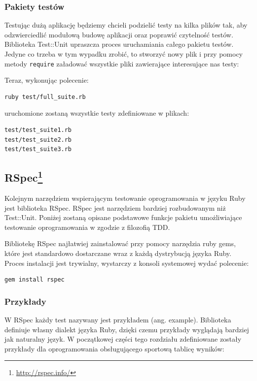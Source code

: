     \subsubsection{Pakiety testów}
    Testując dużą aplikację będziemy chcieli podzielić testy na kilka plików tak, aby odzwierciedlić modułową budowę aplikacji oraz poprawić czytelność testów. Biblioteka Test::Unit upraszcza proces uruchamiania całego pakietu testów. Jedyne co trzeba w tym wypadku zrobić, to stworzyć nowy plik i przy pomocy metody \texttt{require} załadować wszystkie pliki zawierające interesujące nas testy:
    
    
    
    Teraz, wykonując polecenie:
    
\begin{lstlisting} 
ruby test/full_suite.rb
\end{lstlisting}
    
    uruchomione zostaną wszystkie testy zdefiniowane w plikach:
    
\begin{lstlisting} 
test/test_suite1.rb
test/test_suite2.rb
test/test_suite3.rb
\end{lstlisting}
    
    \subsection[RSpec]{RSpec\footnote{\url{http://rspec.info/}\nocite{rspec}}}
    
    Kolejnym narzędziem wspierającym testowanie oprogramowania w języku Ruby jest biblioteka RSpec. RSpec jest narzędziem bardziej rozbudowanym niż Test::Unit. Poniżej zostaną opisane podstawowe funkcje pakietu umożliwiające testowanie oprogramowania w zgodzie z filozofią TDD.
    
    Bibliotekę RSpec najłatwiej zainstalować przy pomocy narzędzia ruby gems, które jest standardowo dostarczane wraz z każdą dystrybucją języka Ruby. Proces instalacji jest trywialny, wystarczy z konsoli systemowej wydać polecenie:
    
\begin{lstlisting}
gem install rspec
\end{lstlisting}
    
    \subsubsection{Przykłady}
    W RSpec każdy test nazywany jest przykładem (ang. example). Biblioteka definiuje własny dialekt języka Ruby, dzięki czemu przykłady wyglądają bardziej jak naturalny język. W początkowej części tego rozdziału zdefiniowane zostały przykłady dla oprogramowania obsługującego sportową tablicę wyników:
    
